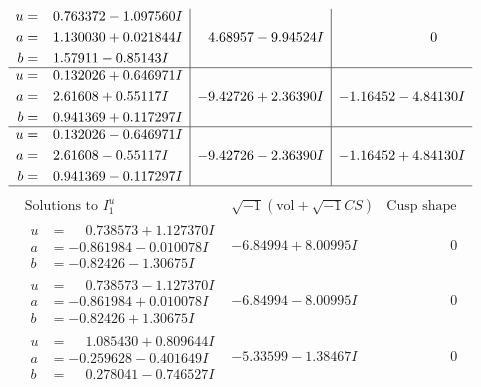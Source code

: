\documentclass[1p]{elsarticle_modified}
\theoremstyle{definition}
\newcommand{\I}{\sqrt{-1}}
\begin{document}
$$\begin{array}{c|c|c}
\begin{aligned}
u &= \phantom{-}0.763372 - 1.097560 I \\
a &= \phantom{-}1.130030 + 0.021844 I \\
b &= \phantom{-}1.57911 - 0.85143 I\end{aligned}
 & \phantom{-}4.68957 - 9.94524 I & \phantom{-0.000000 } 0 \\ \hline\begin{aligned}
u &= \phantom{-}0.132026 + 0.646971 I \\
a &= \phantom{-}2.61608 + 0.55117 I \\
b &= \phantom{-}0.941369 + 0.117297 I\end{aligned}
 & -9.42726 + 2.36390 I & -1.16452 - 4.84130 I \\ \hline\begin{aligned}
u &= \phantom{-}0.132026 - 0.646971 I \\
a &= \phantom{-}2.61608 - 0.55117 I \\
b &= \phantom{-}0.941369 - 0.117297 I\end{aligned}
 & -9.42726 - 2.36390 I & -1.16452 + 4.84130 I\\
 \hline 
 \end{array}$$\newpage$$\begin{array}{c|c|c}  
\text{Solutions to }I^u_{1}& \I (\text{vol} + \sqrt{-1}CS) & \text{Cusp shape}\\
 \hline 
\begin{aligned}
u &= \phantom{-}0.738573 + 1.127370 I \\
a &= -0.861984 - 0.010078 I \\
b &= -0.82426 - 1.30675 I\end{aligned}
 & -6.84994 + 8.00995 I & \phantom{-0.000000 } 0 \\ \hline\begin{aligned}
u &= \phantom{-}0.738573 - 1.127370 I \\
a &= -0.861984 + 0.010078 I \\
b &= -0.82426 + 1.30675 I\end{aligned}
 & -6.84994 - 8.00995 I & \phantom{-0.000000 } 0 \\ \hline\begin{aligned}
u &= \phantom{-}1.085430 + 0.809644 I \\
a &= -0.259628 - 0.401649 I \\
b &= \phantom{-}0.278041 - 0.746527 I\end{aligned}
 & -5.33599 - 1.38467 I & \phantom{-0.000000 } 0 \\ \hline\begin{aligned}

\end{aligned}
\end{array}$$
\end{document}
